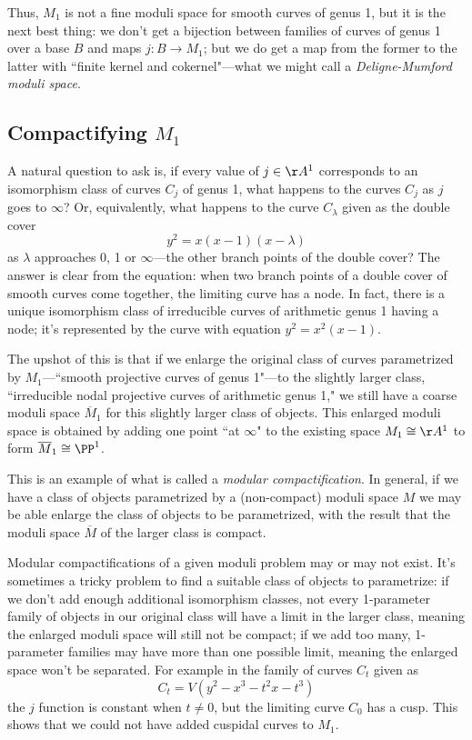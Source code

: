 Thus, $M_1$ is not a fine moduli space for smooth curves of genus 1, but it is the next best thing: we don't get a bijection between families of curves of genus 1 over a base $B$ and maps $j : B \to M_1$; but we do get a map from the former to the latter with ``finite kernel and cokernel"---what we might call a \emph{Deligne-Mumford moduli space}.

\subsection{Compactifying $M_1$}

A natural question to ask is, if every value of $j \in \AA^1$ corresponds to an isomorphism class of curves $C_j$ of genus 1, what happens to the curves $C_j$ as $j$ goes to $\infty$? Or, equivalently, what happens to the curve $C_\lambda$ given as the double cover
$$
y^2 = x(x-1)(x - \lambda)
$$
as $\lambda$ approaches 0, 1 or $\infty$---the other branch points of the double cover? The answer is clear from the equation: when two branch points of a double cover of smooth curves come together, the limiting curve has a node. In fact, there is a unique isomorphism class of irreducible curves of arithmetic genus 1 having a node; it's represented by the curve with equation $y^2=x^2(x-1)$.

The upshot of this is that if we enlarge the original class of curves parametrized by $M_1$---``smooth projective curves of genus 1"---to the slightly larger class, ``irreducible nodal projective curves of arithmetic genus 1," we still have a coarse moduli space $\overline M_1$ for this slightly larger class of objects. This enlarged moduli space is obtained by adding one point ``at $\infty$" to the existing space $M_1 \cong \AA^1$ to form $\overline M_1 \cong \PP^1$.

This is an example of what is called a \emph{modular compactification}. In general, if we have a class of objects parametrized by a (non-compact) moduli space $M$ we may be able enlarge the class of objects to be parametrized, with the result that the moduli space $\overline M$ of the larger class is compact. 

Modular compactifications of a given moduli problem may or may not exist. It's sometimes a tricky problem to find a suitable class of objects to parametrize: if we don't add enough additional isomorphism classes, not every 1-parameter family of objects in our original class will have a limit in the larger class, meaning the enlarged moduli space will still not be compact; if we add too many,  1-parameter families may have more than one possible limit, meaning the enlarged space won't be separated. For example in the family
 of curves $C_t$ given as
$$
C_t = V(y^2 -x^3 - t^2x - t^3)
$$
the $j$ function is constant when $t\neq 0$, but  the limiting curve $C_0$ has a cusp. This shows that
we could not have added cuspidal curves to $M_1$.

